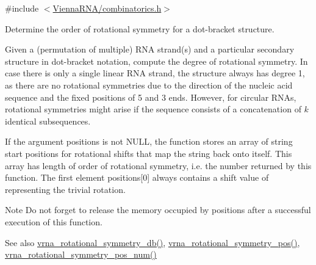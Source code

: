 {\ttfamily \#include $<$\hyperlink{combinatorics_8h}{Vienna\+R\+N\+A/combinatorics.\+h}$>$}



Determine the order of rotational symmetry for a dot-\/bracket structure. 

Given a (permutation of multiple) R\+NA strand(s) and a particular secondary structure in dot-\/bracket notation, compute the degree of rotational symmetry. In case there is only a single linear R\+NA strand, the structure always has degree 1, as there are no rotational symmetries due to the direction of the nucleic acid sequence and the fixed positions of 5\textquotesingle{} and 3\textquotesingle{} ends. However, for circular R\+N\+As, rotational symmetries might arise if the sequence consists of a concatenation of $k$ identical subsequences.

If the argument {\ttfamily positions} is not {\ttfamily N\+U\+LL}, the function stores an array of string start positions for rotational shifts that map the string back onto itself. This array has length of order of rotational symmetry, i.\+e. the number returned by this function. The first element {\ttfamily positions}\mbox{[}0\mbox{]} always contains a shift value of {} representing the trivial rotation.

\begin{DoxyNote}{Note}
Do not forget to release the memory occupied by {\ttfamily positions} after a successful execution of this function.
\end{DoxyNote}
\begin{DoxySeeAlso}{See also}
\hyperlink{group__combinatorics__utils_gad42ffd53025bed9d636d811748db7c5a}{vrna\+\_\+rotational\+\_\+symmetry\+\_\+db()}, \hyperlink{group__combinatorics__utils_ga294d48935fcac87ab335d771fe289ecb}{vrna\+\_\+rotational\+\_\+symmetry\+\_\+pos()}, \hyperlink{group__combinatorics__utils_ga95b5a6ac35da982e2a766f8d2f98a2e1}{vrna\+\_\+rotational\+\_\+symmetry\+\_\+pos\+\_\+num()}
\end{DoxySeeAlso}

